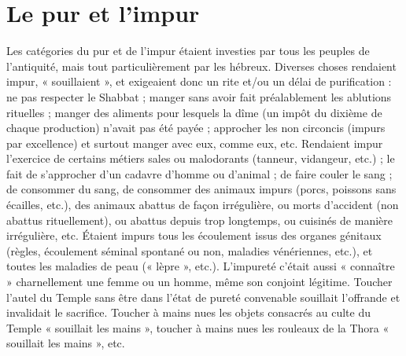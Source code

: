 \section{Le pur et l'impur}

 Les catégories du pur et de l'impur étaient investies par tous les peuples de l'antiquité, mais tout particulièrement par les hébreux. Diverses choses rendaient impur, « souillaient », et exigeaient donc un rite et/ou un délai de purification : ne pas respecter le Shabbat ; manger sans avoir fait préalablement les ablutions rituelles ; manger des aliments pour lesquels la dîme (un impôt du dixième de chaque production) n'avait pas été payée ; approcher les non circoncis (impurs par excellence) et surtout manger avec eux, comme eux, etc. Rendaient impur l'exercice de certains métiers sales ou malodorants (tanneur, vidangeur, etc.) ; le fait de s'approcher d'un cadavre d'homme ou d'animal ; de faire couler le sang ; de consommer du sang, de consommer des animaux impurs (porcs, poissons sans écailles, etc.), des animaux abattus de façon irrégulière, ou morts d'accident (non abattus rituellement), ou abattus depuis trop longtemps, ou cuisinés de manière irrégulière, etc. Étaient impurs tous les écoulement issus des organes génitaux (règles, écoulement séminal spontané ou non, maladies vénériennes, etc.), et toutes les maladies de peau (« lèpre », etc.). L'impureté c'était aussi « connaître » charnellement une femme ou un homme, même son conjoint légitime. Toucher l'autel du Temple sans être dans l'état de pureté convenable souillait l'offrande et invalidait le sacrifice. Toucher à mains nues les objets consacrés au culte du Temple « souillait les mains », toucher à mains nues les rouleaux de la Thora « souillait les mains », etc.

